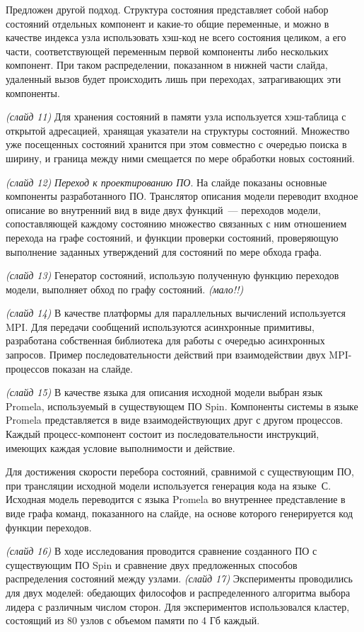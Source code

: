 \documentclass[a4paper,12pt,notitlepage]{article}
\begin{document}
Предложен другой подход. Структура состояния представляет собой набор состояний отдельных
компонент и какие-то общие переменные, и можно в качестве индекса узла использовать
хэш-код не всего состояния целиком, а его части, соответствующей переменным первой
компоненты либо нескольких компонент. При таком распределении, показанном в нижней части
слайда, удаленный вызов будет происходить лишь при переходах, затрагивающих эти
компоненты.

\emph{(слайд 11)} Для хранения состояний в памяти узла используется хэш-таблица с открытой
адресацией, хранящая указатели на структуры состояний. Множество уже посещенных состояний
хранится при этом совместно с очередью поиска в ширину, и граница между ними смещается по
мере обработки новых состояний.

\emph{(слайд 12)} \emph{Переход к проектированию ПО}. На слайде показаны основные
компоненты разработанного ПО. Транслятор описания модели переводит входное описание во
внутренний вид в виде двух функций~--- переходов модели, сопоставляющей каждому состоянию
множество связанных с ним отношением перехода на графе состояний, и функции проверки
состояний, проверяющую выполнение заданных утверждений для состояний по мере обхода графа.

\emph{(слайд 13)} Генератор состояний, использую полученную функцию переходов модели,
выполняет обход по графу состояний. \emph{(мало!!)}

\emph{(слайд 14)} В качестве платформы для параллельных вычислений используется MPI. Для
передачи сообщений используются асинхронные примитивы, разработана собственная библиотека
для работы с очередью асинхронных запросов. Пример последовательности действий при
взаимодействии двух MPI-процессов показан на слайде.

\emph{(слайд 15)} В качестве языка для описания исходной модели выбран язык Promela,
используемый в существующем ПО Spin. Компоненты системы в языке Promela представляется в
виде взаимодействующих друг с другом процессов. Каждый процесс-компонент состоит из
последовательности инструкций, имеющих каждая условие выполнимости и действие.

Для достижения скорости перебора состояний, сравнимой с существующим ПО, при трансляции
исходной модели используется генерация кода на языке~С. Исходная модель переводится с
языка Promela во внутреннее представление в виде графа команд, показанного на слайде, на
основе которого генерируется код функции переходов.

\emph{(слайд 16)} В ходе исследования проводится сравнение созданного ПО с существующим ПО
Spin и сравнение двух предложенных способов распределения состояний между
узлами. \emph{(слайд 17)} Эксперименты проводились для двух моделей: обедающих философов и
распределенного алгоритма выбора лидера с различным числом сторон. Для экспериментов
использовался кластер, состоящий из 80 узлов с объемом памяти по 4 Гб каждый.
\end{document}
